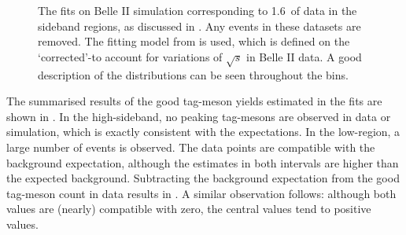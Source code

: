 \begin{figure}[htbp!]
    \centering
    \caption{\label{fig:sideband_mc_fit}    
    The \Mbc fits on Belle II simulation corresponding to 1.6~\invab of data in the \EB sideband regions,
    as discussed in .
    Any \BtoXsgamma events in these datasets are removed.
    The fitting model from  is used,
    which is defined on the `corrected'-\Mbc to account for variations of $\sqrt{s}$ in Belle II data.
    A good description of the \Mbc distributions can be seen throughout the \EB bins.
    }
\end{figure}

The summarised results of the good tag-\B meson yields estimated in the \Mbc fits are shown in .
In the high-\EB sideband, no peaking tag-\B mesons are observed in data or simulation, which is exactly consistent with the expectations.
In the low-\EB region, a large number of events is observed.
The data points are compatible with the background expectation, although the estimates in both intervals are higher than the expected background.
Subtracting the background expectation from the good tag-\B meson count in data results in .
A similar observation follows: although both values are (nearly) compatible with zero,
the central values tend to positive values.

